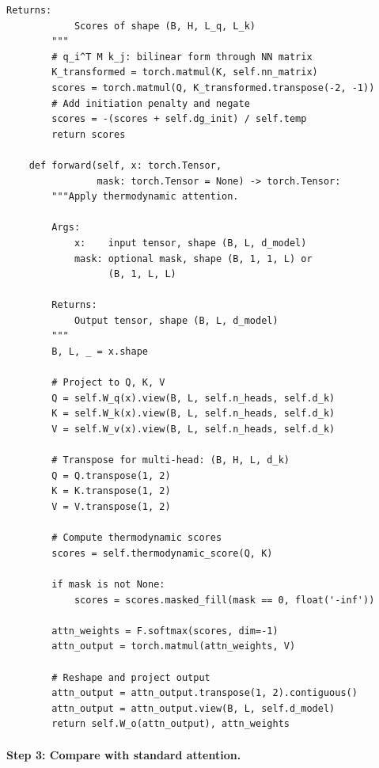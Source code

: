 \begin{lstlisting}[style=dogmapython, caption={Lab 5: Thermodynamic attention mechanism.}]
        Returns:
            Scores of shape (B, H, L_q, L_k)
        """
        # q_i^T M k_j: bilinear form through NN matrix
        K_transformed = torch.matmul(K, self.nn_matrix)
        scores = torch.matmul(Q, K_transformed.transpose(-2, -1))
        # Add initiation penalty and negate
        scores = -(scores + self.dg_init) / self.temp
        return scores

    def forward(self, x: torch.Tensor,
                mask: torch.Tensor = None) -> torch.Tensor:
        """Apply thermodynamic attention.

        Args:
            x:    input tensor, shape (B, L, d_model)
            mask: optional mask, shape (B, 1, 1, L) or
                  (B, 1, L, L)

        Returns:
            Output tensor, shape (B, L, d_model)
        """
        B, L, _ = x.shape

        # Project to Q, K, V
        Q = self.W_q(x).view(B, L, self.n_heads, self.d_k)
        K = self.W_k(x).view(B, L, self.n_heads, self.d_k)
        V = self.W_v(x).view(B, L, self.n_heads, self.d_k)

        # Transpose for multi-head: (B, H, L, d_k)
        Q = Q.transpose(1, 2)
        K = K.transpose(1, 2)
        V = V.transpose(1, 2)

        # Compute thermodynamic scores
        scores = self.thermodynamic_score(Q, K)

        if mask is not None:
            scores = scores.masked_fill(mask == 0, float('-inf'))

        attn_weights = F.softmax(scores, dim=-1)
        attn_output = torch.matmul(attn_weights, V)

        # Reshape and project output
        attn_output = attn_output.transpose(1, 2).contiguous()
        attn_output = attn_output.view(B, L, self.d_model)
        return self.W_o(attn_output), attn_weights
\end{lstlisting}

\paragraph{Step 3: Compare with standard attention.}

